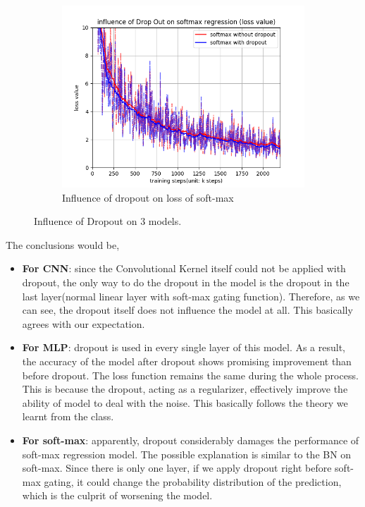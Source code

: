 \documentclass[12pt,letterpaper]{article}
\begin{document}
\begin{figure}[h]
\begin{subfigure}{0.32\textwidth}
    \includegraphics[width=\linewidth]{softmax_dropout_loss.png}
    \caption{\small Influence of dropout on loss of soft-max} \label{fig:d}
    \end{subfigure}
    \caption{Influence of Dropout on $3$ models.} \label{fig:Drop}
\end{figure}

The conclusions would be,
\begin{itemize}
    \item \textbf{For CNN}: since the Convolutional Kernel itself could not be applied with dropout, the only way to do the dropout in the model is the dropout in the last layer(normal linear layer with soft-max gating function). Therefore, as we can see, the dropout itself does not influence the model at all. This basically agrees with our expectation.
    \item \textbf{For MLP}: dropout is used in every single layer of this model. As a result, the accuracy of the model after dropout shows promising improvement than before dropout. The loss function remains the same during the whole process. This is because the dropout, acting as a regularizer, effectively improve the ability of model to deal with the noise. This basically follows the theory we learnt from the class.
    \item \textbf{For soft-max}: apparently, dropout considerably damages the performance of soft-max regression model. The possible explanation is similar to the BN on soft-max. Since there is only one layer, if we apply dropout right before soft-max gating, it could change the probability distribution of the prediction, which is the culprit of worsening the model.
\end{itemize}
\end{document}
